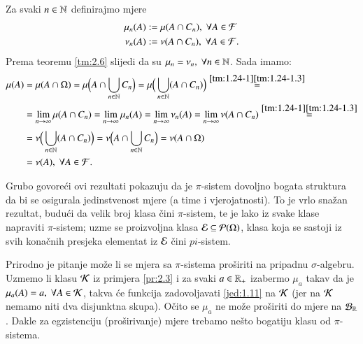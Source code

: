 \begin{rj}[\ref{zad:2.9}]
    Za svaki $n \in \mathbb{N}$ definirajmo mjere
    \begin{equation*}
        \begin{aligned}
            \mu_n (A) &:= \mu (A \cap C_n), \; \forall A \in \mathcal{F}\\
            \nu_n (A) &:= \nu (A \cap C_n), \; \forall A \in \mathcal{F}.
        \end{aligned}
    \end{equation*}
    Prema teoremu \ref{tm:2.6} slijedi da su $\mu_n = \nu_n, \; \forall n \in \mathbb{N}$. Sada imamo:
    \begin{equation*}
        \begin{aligned}
            \mu (A) &= \mu (A \cap \Omega) = \mu \Big( A \cap \bigcup\limits_{n \in \mathbb{N}}^{} C_n \Big) = \mu \Big( \bigcup\limits_{n \in \mathbb{N}}^{} (A \cap C_n) \Big) \overset{\ref{tm:1.24-1} \eqref{tm:1.24-1.3}}{=}\\
            &= \lim\limits_{n \to \infty} \mu(A \cap C_n) = \lim\limits_{n \to \infty} \mu_n (A) = \lim\limits_{n \to \infty} \nu_n (A) = \lim\limits_{n \to \infty} \nu (A \cap C_n) \overset{\ref{tm:1.24-1} \eqref{tm:1.24-1.3}}{=}\\
            &= \nu \Big( \bigcup\limits_{n \in \mathbb{N}}^{} (A \cap C_n) \Big) = \nu \Big( A \cap \bigcup\limits_{n \in \mathbb{N}}^{} C_n \Big) = \nu(A \cap \Omega)\\
            &= \nu(A), \; \forall A \in \mathcal{F}.
        \end{aligned}
    \end{equation*}
\end{rj}

\begin{nap} \label{nap:2.10}
    Grubo govore\' ci ovi rezultati pokazuju da je $\pi$-sistem dovoljno bogata struktura da bi se osigurala jedinstvenost mjere (a time i vjerojatnosti).
    To je vrlo sna\v zan rezultat, budu\' ci da velik broj klasa \v cini $\pi$-sistem, te je lako iz svake klase napraviti $\pi$-sistem; uzme se proizvoljna klasa $\mathcal{E} \subseteq \mathcal{P}({\Omega})$, klasa koja se sastoji iz svih kona\v cnih presjeka elementat iz $\mathcal{E}$ \v cini $pi$-sistem.

    Prirodno je pitanje mo\v ze li se mjera sa $\pi$-sistema pro\v siriti na pripadnu $\sigma$-algebru.
    Uzmemo li klasu $\mathcal{K}$ iz primjera \ref{pr:2.3} i za svaki $a \in \mathbb{R}_+$ izabermo $\mu_a$ takav da je $\mu_a(A) = a, \; \forall A \in \mathcal{K}$, takva \' ce funkcija zadovoljavati \eqref{jed:1.11} na $\mathcal{K}$ (jer na $\mathcal{K}$ nemamo niti dva disjunktna skupa).
    O\v cito se $\mu_a$ ne mo\v ze pro\v siriti do mjere na $\mathcal{B}_{\mathbb{R}}$.
    Dakle za egzistenciju  (pro\v sirivanje) mjere trebamo ne\v sto bogatiju klasu od $\pi$-sistema.
\end{nap}

